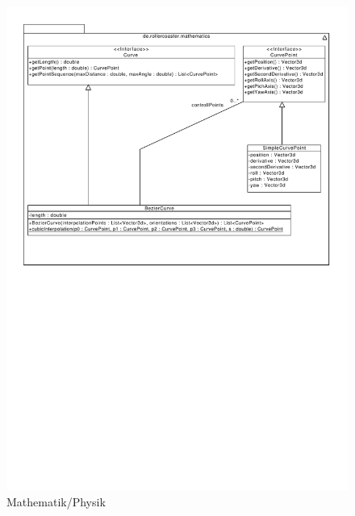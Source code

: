\begin{figure}
\includegraphics[width=\linewidth]{bilder/Mathematics}
\caption{Mathematik/Physik}
\end{figure}

